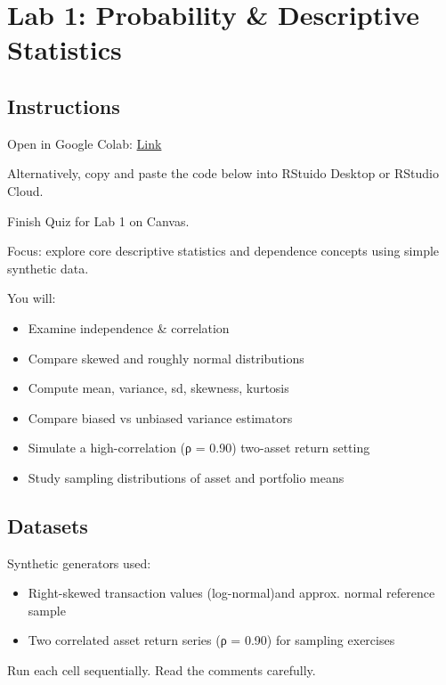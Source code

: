 \documentclass[
  12pt,
  letterpaper,
]{scrbook}
\providecommand{\tightlist}{%
  \setlength{\itemsep}{0pt}\setlength{\parskip}{0pt}}
\renewcommand{\tightlist}{\setlength{\itemsep}{0.5\baselineskip}\setlength{\parskip}{0.2\baselineskip}}
\theoremstyle{plain}
\theoremstyle{definition}
\theoremstyle{remark}
\begin{document}
\chapter{Lab 1: Probability \& Descriptive
Statistics}\label{lab-1-probability-descriptive-statistics}

\section{Instructions}\label{instructions}

Open in Google Colab:
\href{https://colab.research.google.com/drive/1JLABtp6OJUJHmODRHpQ9FQXovp73na_9?usp=share_link}{Link}

Alternatively, copy and paste the code below into RStuido Desktop or
RStudio Cloud.

Finish Quiz for Lab 1 on Canvas.

Focus: explore core descriptive statistics and dependence concepts using
simple synthetic data.

You will:

\begin{itemize}
\tightlist
\item
  Examine independence \& correlation
\item
  Compare skewed and roughly normal distributions
\item
  Compute mean, variance, sd, skewness, kurtosis
\item
  Compare biased vs unbiased variance estimators
\item
  Simulate a high-correlation (ρ = 0.90) two-asset return setting
\item
  Study sampling distributions of asset and portfolio means
\end{itemize}

\section{Datasets}\label{datasets}

Synthetic generators used:

\begin{itemize}
\tightlist
\item
  Right-skewed transaction values (log-normal)and approx. normal
  reference sample
\item
  Two correlated asset return series (ρ = 0.90) for sampling exercises
\end{itemize}

Run each cell sequentially. Read the comments carefully.
\end{document}
